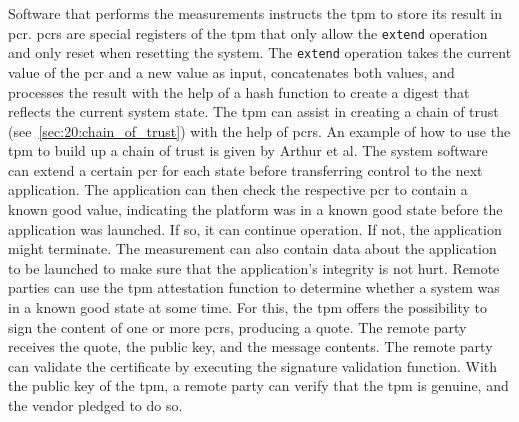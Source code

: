 Software that performs the measurements instructs the \gls{tpm} to store its
result in \gls{pcr}. \glspl{pcr} are special registers of the \gls{tpm} that only
allow the \texttt{extend} operation and only reset when resetting the system.
The \texttt{extend} operation takes the current value of the \gls{pcr} and a new
value as input, concatenates both values, and processes the result with the help
of a hash function to create a digest that reflects the current system state.
The \gls{tpm} can assist in creating a chain of trust
(see~\ref{sec:20:chain_of_trust}) with the help of \glspl{pcr}. An example of how
to use the \gls{tpm} to build up a chain of trust is given by Arthur et
al.\cite{arthur2015practical} The system software can extend a certain \gls{pcr}
for each state before transferring control to the next application. The
application can then check the respective \gls{pcr} to contain a known good
value, indicating the platform was in a known good state before the application
was launched. If so, it can continue operation. If not, the application might
terminate. The measurement can also contain data about the application to be
launched to make sure that the application's integrity is not hurt. Remote
parties can use the \gls{tpm} attestation function to determine whether a system
was in a known good state at some time. For this, the \gls{tpm} offers the
possibility to sign the content of one or more \glspl{pcr}, producing a quote.
The remote party receives the quote, the public key, and the message contents.
The remote party can validate the certificate by executing the signature
validation function. With the public key of the \gls{tpm}, a remote party can
verify that the \gls{tpm} is genuine, and the vendor pledged to do so.
